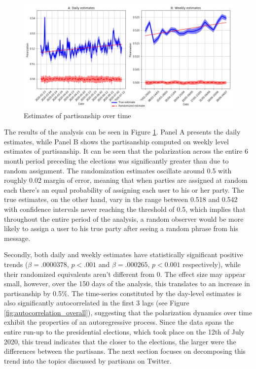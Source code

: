 \documentclass{article}
\begin{document}
	\begin{figure}[h!]
		\includegraphics[width=\columnwidth]{figures/polarization_overall.png}
		\caption{Estimates of partisanship over time}
		\label{fig:overall}
	\end{figure}

	The results of the analysis can be seen in Figure \ref{fig:overall}. Panel A presents the daily estimates, while Panel B shows the partisanship computed on weekly level estimates of partisanship. It can be seen that the polarization across the entire 6 month period preceding the elections was significantly greater than due to random assignment. The randomization estimates oscillate around 0.5 with roughly 0.02 margin of error, meaning that when parties are assigned at random each there’s an equal probability of assigning each user to his or her party. The true estimates, on the other hand, vary in the range between 0.518 and 0.542 with confidence intervals never reaching the threshold of 0.5, which implies that throughout the entire period of the analysis, a random observer would be more likely to assign a user to his true party after seeing a random phrase from his message. 
	
	Secondly, both daily and weekly estimates have statistically significant positive trends ($\beta = .0000378$, $p < .001$ and $\beta = .000265$, $p < 0.001$ respectively), while their randomized equivalents aren’t different from 0. The effect size may appear small, however, over the 150 days of the analysis, this translates to an increase in partisanship by 0.5\%. The time-series constituted by the day-level estimates is also significantly autocorrelated in the first 3 lags (see Figure \ref{fig:autocorrelation_overall}), suggesting that the polarization dynamics over time exhibit the properties of an autoregressive process. Since the data spans the entire run-up to the presidential elections, which took place on the 12th of July 2020, this trend indicates that the closer to the elections, the larger were the differences between the partisans. The next section focuses on decomposing this trend into the topics discussed by partisans on Twitter.
	
\end{document}
